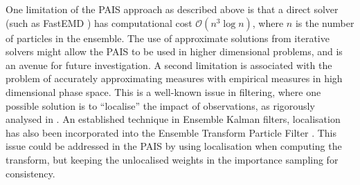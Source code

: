 \documentclass[final]{siamltex}
\begin{document}
One limitation of the PAIS approach as described above is that a
direct solver (such as FastEMD \cite{FastEMD}) has computational cost
$\mathcal{O}(n^3\log n)$, where $n$ is the number of particles in the
ensemble.  The use of approximate solutions from iterative solvers
might allow the PAIS to be used in higher dimensional problems, and is
an avenue for future investigation. A second limitation is associated
with the problem of accurately approximating measures with empirical
measures in high dimensional phase space. This is a well-known issue
in filtering, where one possible solution is to ``localise'' the
impact of observations, as rigorously analysed in
\cite{rebeschini2013can}. An established technique in Ensemble Kalman
filters, localisation has also been incorporated into the Ensemble
Transform Particle Filter \cite{ChRe2015}. This issue could be
addressed in the PAIS by using localisation when computing the
transform, but keeping the unlocalised weights in the importance
sampling for consistency.



\end{document}
